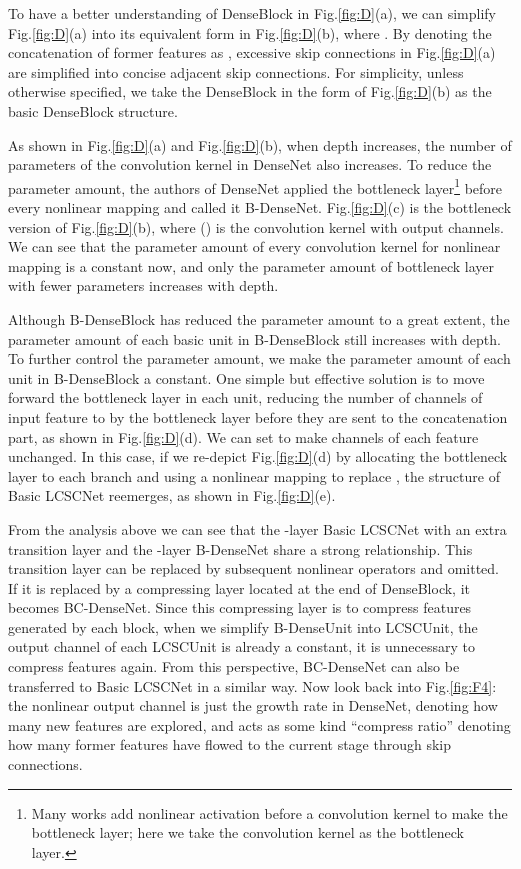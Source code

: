 \documentclass[journal]{IEEEtran}
\begin{document}
To have a better understanding of DenseBlock in Fig.\ref{fig:D}(a), we can simplify Fig.\ref{fig:D}(a) into its equivalent form in Fig.\ref{fig:D}(b), where  . By denoting the concatenation of former features as , excessive skip connections in Fig.\ref{fig:D}(a) are simplified into concise adjacent skip connections. For simplicity, unless otherwise specified, we take the DenseBlock in the form of Fig.\ref{fig:D}(b) as the basic DenseBlock structure.

As shown in Fig.\ref{fig:D}(a) and Fig.\ref{fig:D}(b), when depth increases, the number of parameters of the convolution kernel in DenseNet also increases. To reduce the parameter amount, the authors of DenseNet applied the bottleneck layer\footnote{Many works add nonlinear activation before a  convolution kernel to make the bottleneck layer; here we take the  convolution kernel as the bottleneck layer.} before every nonlinear mapping and called it B-DenseNet. Fig.\ref{fig:D}(c) is the bottleneck version of Fig.\ref{fig:D}(b), where  () is the  convolution kernel with  output channels. We can see that the parameter amount of every convolution kernel  for nonlinear mapping is a constant now, and only the parameter amount of bottleneck layer with fewer parameters increases with depth. 

Although B-DenseBlock has reduced the parameter amount to a great extent, the parameter amount of each basic unit in B-DenseBlock still increases with depth. To further control the parameter amount, we make the parameter amount of each unit in B-DenseBlock a constant. One simple but effective solution is to move forward the bottleneck layer in each unit, reducing the number of channels of input feature to  by the bottleneck layer before they are sent to the concatenation part, as shown in Fig.\ref{fig:D}(d). We can set  to make channels of each feature unchanged. In this case, if we re-depict Fig.\ref{fig:D}(d) by allocating the bottleneck layer to each branch and using a nonlinear mapping  to replace , the structure of Basic LCSCNet reemerges, as shown in Fig.\ref{fig:D}(e). 

From the analysis above we can see that the -layer Basic LCSCNet with an extra transition layer and the -layer B-DenseNet share a strong relationship. This transition layer can be replaced by subsequent nonlinear operators and omitted. If it is replaced by a compressing layer located at the end of DenseBlock, it becomes BC-DenseNet. Since this compressing layer is to compress features generated by each block, when we simplify B-DenseUnit into LCSCUnit, the output channel of each LCSCUnit is already a constant, it is unnecessary to compress features again. From this perspective, BC-DenseNet can also be transferred to Basic LCSCNet in a similar way. Now look back into Fig.\ref{fig:F4}: the nonlinear output channel is just the growth rate in DenseNet, denoting how many new features are explored, and  acts as some kind ``compress ratio'' denoting how many former features have flowed to the current stage through skip connections. 
\end{document}
